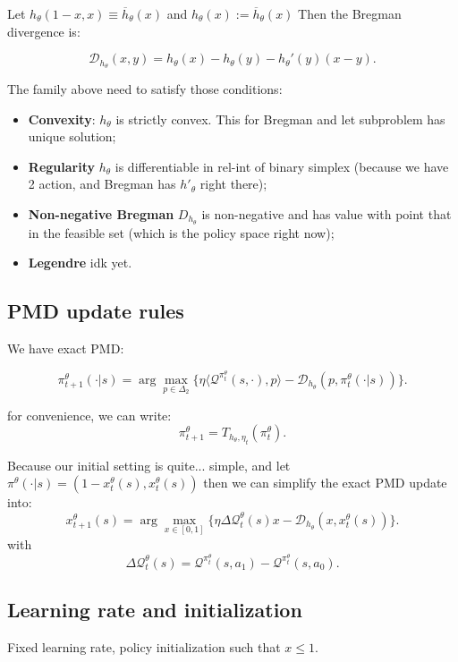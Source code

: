 \documentclass[11pt,a4paper]{article}
\begin{document}
Let $h_{\theta}(1-x, x) \equiv \overline{h}_{\theta}(x)$ and $h_{\theta}(x) := \overline{h}_{\theta}(x) $ Then the Bregman divergence is:

\[
\mathcal{D}_{h_{\theta}}(x,y) = h_{\theta}(x) - h_{\theta}(y) - h_{\theta}'(y)(x-y).
\]

The family above need to satisfy those conditions:
\begin{itemize}
    \item \textbf{Convexity}: $h_{\theta}$ is strictly convex. This for Bregman and let subproblem has unique solution;
    \item \textbf{Regularity} $h_{\theta}$ is differentiable in rel-int of binary simplex (because we have 2 action, and Bregman has $h'_{\theta}$ right there);
    \item \textbf{Non-negative Bregman} $D_{h_{\theta}}$ is non-negative and has value with point that in the feasible set (which is the policy space right now);
    \item \textbf{Legendre} idk yet.
    
\end{itemize}

\subsection{PMD update rules}

We have exact PMD:

\[
\pi^{\theta}_{t+1}(\cdot|s) = \arg\max_{p\in \Delta_2}\{\eta\langle\mathcal{Q}^{\pi^{\theta}_t}(s, \cdot),p\rangle - \mathcal{D}_{h_{\theta}}(p, \pi_t^{\theta}(\cdot|s))\}.
\]

for convenience, we can write:
\[
\pi^{\theta}_{t+1} = T_{h_{\theta}, \eta_t}(\pi^{\theta}_t).
\]

Because our initial setting is quite... simple, and let $\pi^{\theta}(\cdot|s) = (1 - x^{\theta}_t(s), x^{\theta}_t(s)) $ then we can simplify the exact PMD update into:
\[
x^{\theta}_{t+1}(s) = \arg\max_{x\in [0,1]}\{\eta\Delta\mathcal{Q}^{\theta}_t(s)x - \mathcal{D}_{h_{\theta}}(x, x_t^{\theta}(s))\}.
\]
with
\[
\Delta\mathcal{Q}^{\theta}_t(s) = \mathcal{Q}^{\pi^\theta_t}(s,a_1) - \mathcal{Q}^{\pi^\theta_t}(s,a_0).
\]

\subsection{Learning rate and initialization}
Fixed learning rate, policy initialization such that $x \le 1$.
\end{document}
